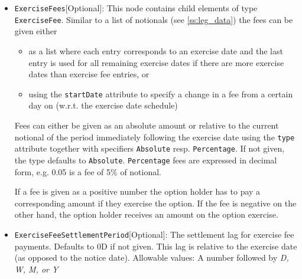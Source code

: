 \begin{itemize}

\item \lstinline!ExerciseFees![Optional]: This node contains child elements of type \lstinline!ExerciseFee!. Similar to a list of notionals
  (see \ref{ss:leg_data}) the fees can be given either

  \begin{itemize}
  \item as a list where each entry corresponds to an exercise date and the last entry is used for all remaining exercise
    dates if there are more exercise dates than exercise fee entries, or
  \item using the \verb+startDate+ attribute to specify a change in a fee from a certain day on (w.r.t. the exercise
    date schedule)
  \end{itemize}

  Fees can either be given as an absolute amount or relative to the current notional of the period immediately following
  the exercise date using the \verb+type+ attribute together with specifiers \verb+Absolute+ resp. \verb+Percentage+. If
  not given, the type defaults to \verb+Absolute+. \verb+Percentage+ fees are expressed in decimal form, e.g. 0.05 is a fee of 5\% of notional.

  If a fee is given as a positive number the option holder has to pay a corresponding amount if they exercise the
  option. If the fee is negative on the other hand, the option holder receives an amount on the option exercise.

\item \lstinline!ExerciseFeeSettlementPeriod![Optional]: The settlement lag for exercise fee payments. Defaults to 0D if not
  given. This lag is relative to the exercise date (as opposed to the notice date). Allowable values: A number followed by \emph{D, W, M, or Y}


\end{itemize}
